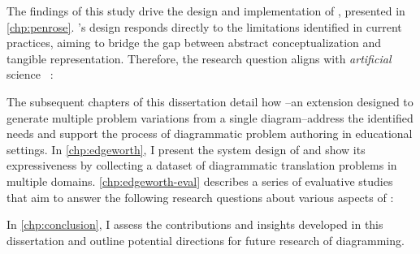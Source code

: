 
The findings of this study drive the design and implementation of \Penrose, presented in \cref{chp:penrose}. \Penrose's design responds directly to the limitations identified in current practices, aiming to bridge the gap between abstract conceptualization and tangible representation. Therefore, the research question aligns with \textit{artificial} science ~\cite{simon_sciences_1969}:


The subsequent chapters of this dissertation detail how \Edgeworth--an extension designed to generate multiple problem variations from a single diagram--address the identified needs and support the process of diagrammatic problem authoring in educational settings. In \cref{chp:edgeworth}, I present the system design of \Edgeworth and show its expressiveness by collecting a dataset of diagrammatic translation problems in multiple domains. \cref{chp:edgeworth-eval} describes a series of evaluative studies that aim to answer the following research questions about various aspects of \Edgeworth:


In \cref{chp:conclusion}, I assess the contributions and insights developed in this dissertation and outline potential directions for future research of diagramming.



